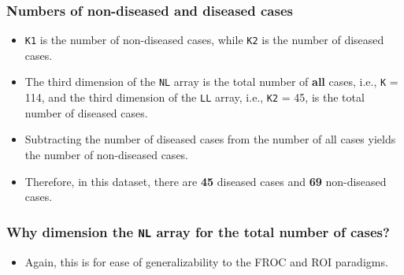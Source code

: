 \documentclass[]{book}
\newenvironment{Shaded}{\begin{snugshade}}{\end{snugshade}}
\newcommand{\DecValTok}[1]{\textcolor[rgb]{0.00,0.00,0.81}{#1}}
\newcommand{\KeywordTok}[1]{\textcolor[rgb]{0.13,0.29,0.53}{\textbf{#1}}}
\newcommand{\NormalTok}[1]{#1}
\newcommand{\OperatorTok}[1]{\textcolor[rgb]{0.81,0.36,0.00}{\textbf{#1}}}
\newcommand{\StringTok}[1]{\textcolor[rgb]{0.31,0.60,0.02}{#1}}
\providecommand{\tightlist}{%
  \setlength{\itemsep}{0pt}\setlength{\parskip}{0pt}}
\begin{document}
\hypertarget{numbers-of-non-diseased-and-diseased-cases}{%
\subsubsection{Numbers of non-diseased and diseased cases}\label{numbers-of-non-diseased-and-diseased-cases}}

\begin{Shaded}
\end{Shaded}

\begin{itemize}
\item
  \texttt{K1} is the number of non-diseased cases, while \texttt{K2} is the number of diseased cases.
\item
  The third dimension of the \texttt{NL} array is the total number of \textbf{all} cases, i.e., \texttt{K} = 114, and the third dimension of the \texttt{LL} array, i.e., \texttt{K2} = 45, is the total number of diseased cases.
\item
  Subtracting the number of diseased cases from the number of all cases yields the number of non-diseased cases.
\item
  Therefore, in this dataset, there are \textbf{45} diseased cases and \textbf{69} non-diseased cases.
\end{itemize}

\hypertarget{why-dimension-the-nl-array-for-the-total-number-of-cases}{%
\subsubsection{\texorpdfstring{Why dimension the \texttt{NL} array for the total number of cases?}{Why dimension the NL array for the total number of cases?}}\label{why-dimension-the-nl-array-for-the-total-number-of-cases}}

\begin{itemize}
\tightlist
\item
  Again, this is for ease of generalizability to the FROC and ROI paradigms.
\end{itemize}
\end{document}
